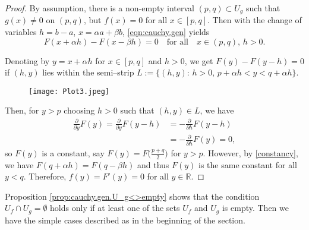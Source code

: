 \documentclass{birkjour}
\begin{document}
\begin{proof}
By assumption, there is a non-empty interval $(p,q)\subset U_g$ such that $g(x)\neq 0$ on $(p,q)$, but $f(x)=0$ for all $x\in[p,q]$. Then with the change of variables $h=b-a$, $x=\alpha a+\beta b$, \eqref{eqn:cauchy.gen} yields
\begin{equation} \label{constancy} 
F(x+\alpha h) - F(x-\beta h) = 0 \quad \text{for all} \quad  x\in (p,q), \, h>0.
\end{equation} 

Denoting by $y=x+\alpha h$ for $x\in[p,q]$ and $h>0$, we get $F(y)-F(y-h) = 0$ if $(h,y)$ lies within the semi--strip $L := \bigl\{(h,y):\, h>0, \, p+\alpha h<y<q+\alpha h\bigr\}$. 
\begin{figure}[h!]
  \caption{}
  \centering
    \texttt{[image: Plot3.jpeg]}
\end{figure}

\smallskip
\noindent
Then, for $y>p$ choosing $h>0$ such that $(h,y)\in L$, we have
\begin{align*}
\frac{\partial}{\partial y}F(y) = \frac{\partial}{\partial y}F(y-h) &= -\frac{\partial}{\partial h}F(y-h)\\
                                                                   &= -\frac{\partial}{\partial h}F(y) =0, 
                                                                   
\end{align*}
so $F(y)$ is a constant, say $F(y)=F\bigl(\frac{p+q}{2}\bigr)$ for $y>p$. However, by \eqref{constancy}, we have $F(q+\alpha h) = F(q-\beta h)$ and thus $F(y)$ is the same constant for all $y<q$. Therefore, $f(y)=F'(y)=0$ for all $y\in{{\mathbb R}}$.
\end{proof}

Proposition \ref{prop:cauchy.gen.U_g<>empty} shows that the condition $U_f\cap U_g=\emptyset$ holds only if at least one of the sets $U_f$ and $U_g$ is empty. Then we have the simple cases described as in the beginning of the section.
\end{document}
